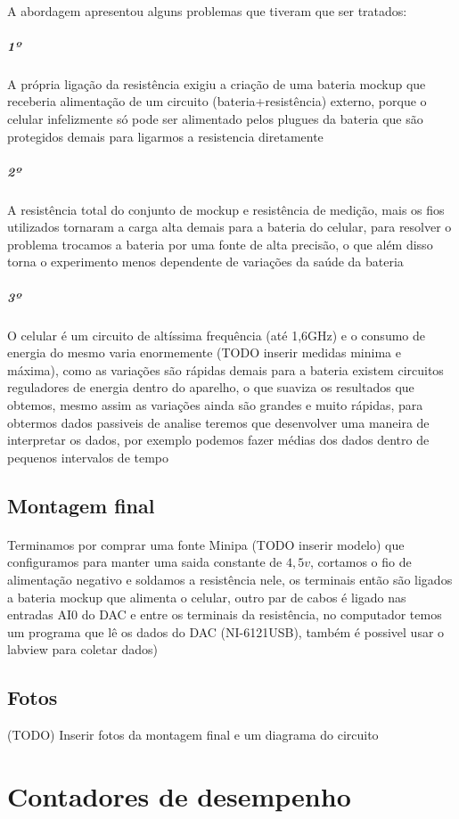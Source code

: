 \documentclass[11pt,a4paper,titlepage]{article}
\begin{document}
\paragraph{} A abordagem apresentou alguns problemas que tiveram que ser tratados:
\subparagraph*{1º} A própria ligação da resistência exigiu a criação de uma bateria mockup que receberia alimentação de um circuito (bateria+resistência) externo, porque o celular infelizmente só pode ser alimentado pelos plugues da bateria que são protegidos demais para ligarmos a resistencia diretamente
\subparagraph*{2º} A resistência total do conjunto de mockup e resistência de medição, mais os fios utilizados tornaram a carga alta demais para a bateria do celular, para resolver o problema trocamos a bateria por uma fonte de alta precisão, o que além disso torna o experimento menos dependente de variações da saúde da bateria
\subparagraph*{3º} O celular é um circuito de altíssima frequência (até 1,6GHz) e o consumo de energia do mesmo varia enormemente (TODO inserir medidas minima e máxima), como as variações são rápidas demais para a bateria existem circuitos reguladores de energia dentro do aparelho, o que suaviza os resultados que obtemos, mesmo assim as variações ainda são grandes e muito rápidas, para obtermos dados passiveis de analise teremos que desenvolver uma maneira de interpretar os dados, por exemplo podemos fazer médias dos dados dentro de pequenos intervalos de tempo
\subsection{Montagem final}
\paragraph{} Terminamos por comprar uma fonte Minipa (TODO inserir modelo) que configuramos para manter uma saida constante de $4,5v$, cortamos o fio de alimentação negativo e soldamos a resistência nele, os terminais então são ligados a bateria mockup que alimenta o celular, outro par de cabos é ligado nas entradas AI0 do DAC e entre os terminais da resistência, no computador temos um programa que lê os dados do DAC (NI-6121USB), também é possivel usar o labview para coletar dados)
\subsection{Fotos}
(TODO) Inserir fotos da montagem final e um diagrama do circuito
\section{Contadores de desempenho}
\end{document}
